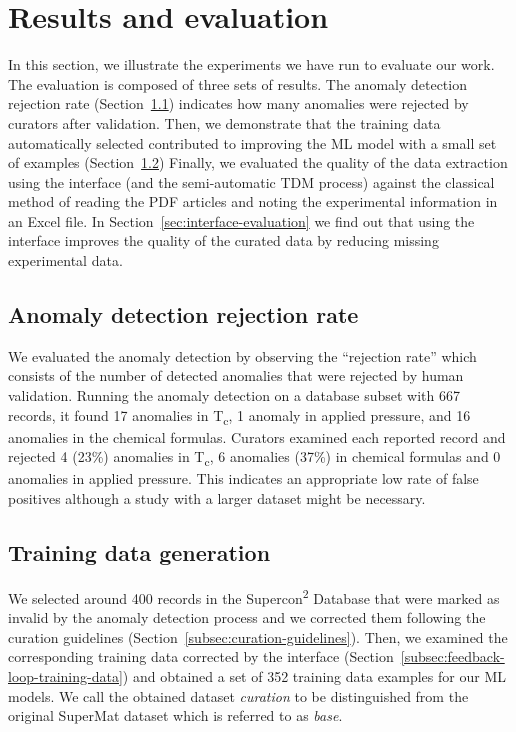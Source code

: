 
\section{Results and evaluation}
\label{sec:results-and-evaluation}

In this section, we illustrate the experiments we have run to evaluate our work. 
The evaluation is composed of three sets of results. 
The anomaly detection rejection rate (Section~\ref{subsec:anomaly-detection-evaluation}) indicates how many anomalies were rejected by curators after validation. 
Then, we demonstrate that the training data automatically selected contributed to improving the ML model with a small set of examples (Section~\ref{subsec:training-data-generation-evaluation}) 
Finally, we evaluated the quality of the data extraction using the interface (and the semi-automatic TDM process) against the classical method of reading the PDF articles and noting the experimental information in an Excel file. In Section~\ref{sec:interface-evaluation} we find out that using the interface improves the quality of the curated data by reducing missing experimental data. 


\subsection{Anomaly detection rejection rate}
\label{subsec:anomaly-detection-evaluation}

We evaluated the anomaly detection by observing the ``rejection rate'' which consists of the number of detected anomalies that were rejected by human validation. 
Running the anomaly detection on a database subset with 667 records, it found 17 anomalies in T\textsubscript{c}, 1 anomaly in applied pressure, and 16 anomalies in the chemical formulas. 
Curators examined each reported record and rejected 4 (23\%) anomalies in T\textsubscript{c}, 6 anomalies (37\%) in chemical formulas and 0 anomalies in applied pressure. 
This indicates an appropriate low rate of false positives although a study with a larger dataset might be necessary. 

\subsection{Training data generation}
\label{subsec:training-data-generation-evaluation}
We selected around 400 records in the Supercon\textsuperscript{2} Database that were marked as invalid by the anomaly detection process and we corrected them following the curation guidelines (Section~\ref{subsec:curation-guidelines}).
Then, we examined the corresponding training data corrected by the interface (Section~\ref{subsec:feedback-loop-training-data}) and obtained a set of 352 training data examples for our ML models. 
We call the obtained dataset \emph{curation} to be distinguished from the original SuperMat dataset which is referred to as \emph{base}.


